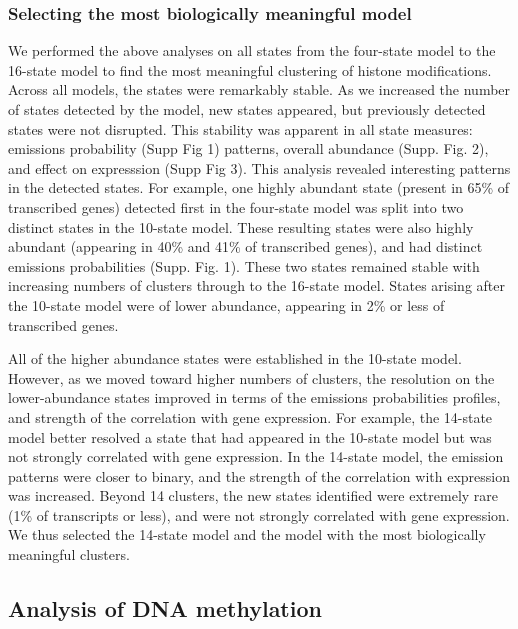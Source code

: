 \documentclass[10pt,letterpaper]{article}
\begin{document}
\color{lightgray}

\hypertarget{selecting-the-most-biologically-meaningful-model}{%
\subsubsection{Selecting the most biologically meaningful
model}\label{selecting-the-most-biologically-meaningful-model}}

We performed the above analyses on all states from the four-state model
to the 16-state model to find the most meaningful clustering of histone
modifications. Across all models, the states were remarkably stable. As
we increased the number of states detected by the model, new states
appeared, but previously detected states were not disrupted. This
stability was apparent in all state measures: emissions probability
(Supp Fig 1) patterns, overall abundance (Supp. Fig. 2), and effect on
expresssion (Supp Fig 3). This analysis revealed interesting patterns in
the detected states. For example, one highly abundant state (present in
65\% of transcribed genes) detected first in the four-state model was
split into two distinct states in the 10-state model. These resulting
states were also highly abundant (appearing in 40\% and 41\% of
transcribed genes), and had distinct emissions probabilities (Supp. Fig.
1). These two states remained stable with increasing numbers of clusters
through to the 16-state model. States arising after the 10-state model
were of lower abundance, appearing in 2\% or less of transcribed genes.

All of the higher abundance states were established in the 10-state
model. However, as we moved toward higher numbers of clusters, the
resolution on the lower-abundance states improved in terms of the
emissions probabilities profiles, and strength of the correlation with
gene expression. For example, the 14-state model better resolved a state
that had appeared in the 10-state model but was not strongly correlated
with gene expression. In the 14-state model, the emission patterns were
closer to binary, and the strength of the correlation with expression
was increased. Beyond 14 clusters, the new states identified were
extremely rare (1\% of transcripts or less), and were not strongly
correlated with gene expression. We thus selected the 14-state model and
the model with the most biologically meaningful clusters. \color{black}

\hypertarget{analysis-of-dna-methylation}{%
\subsection{Analysis of DNA
methylation}\label{analysis-of-dna-methylation}}
\end{document}
